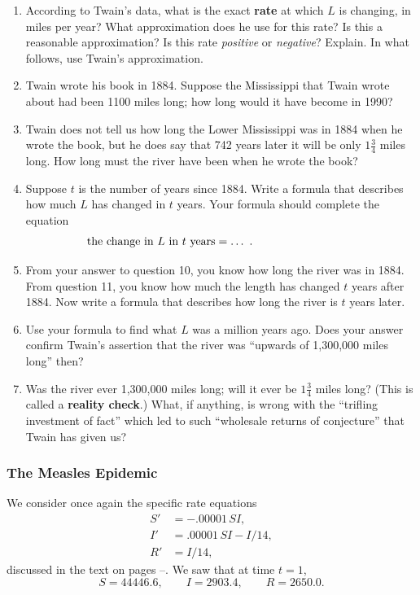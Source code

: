 \begin{enumerate}
\item According to Twain's data, what is the exact {\bf
  rate} at which $L$ is changing, in miles per year?  What
approximation does he use for this rate?  Is this a reasonable
approximation? Is this rate {\em positive\/} or {\em negative\/}?
Explain.  In what follows, use Twain's approximation.


\item Twain wrote his book in 1884.  Suppose the Mississippi that Twain
wrote about had been 1100 miles long; how long would it have become in
1990?


\item Twain does not tell us how long the Lower Mississippi was in 1884
when he wrote the book, but he does say that 742 years later it will
be only $1\tfrac{3}{4}$ miles long.  How long must the river have been
when he wrote the book?


\item Suppose $t$ is the number of years since 1884.  Write a formula
that describes how much $L$ has changed in $t$ years.  Your formula
should complete the equation
\[
\mbox{the change in $L$ in $t$ years} = \ldots \ . \rule{90pt}{0pt}
\]


\item From your answer to question 10, you know how long the river was
in 1884.  From question 11, you know how much the length has changed
$t$ years after 1884.  Now write a formula that describes how long the
river is $t$ years later.


\item Use your formula to find what $L$ was a million years ago.  Does
your answer confirm Twain's assertion that the river was ``upwards of
1,300,000 miles long'' then?


\item Was the river ever 1,300,000 miles long; will it ever be
$1\tfrac{3}{4}$ miles long?  (This is called a {\bf reality check}.)
What, if anything, is wrong with the ``trifling investment of fact''
which led to such ``wholesale returns of conjecture'' that Twain has
given us?


\end{enumerate}
\subsubsection{The Measles Epidemic}
\label{subsubsec:the-measles-epidemic}

We consider once again the specific rate equations 
\begin{align*}
S' &= -.00001 \, SI, \\
I' &= .00001 \, SI - I/14, \\
R' &= I/14, 
\end{align*}
discussed in the text on pages
\pageref{`analyzestart'}--\pageref{`analyzeend'}.  We saw that at time
$t = 1$,
\[
S = 44446.6, \qquad I = 2903.4, \qquad R = 2650.0.
\]


